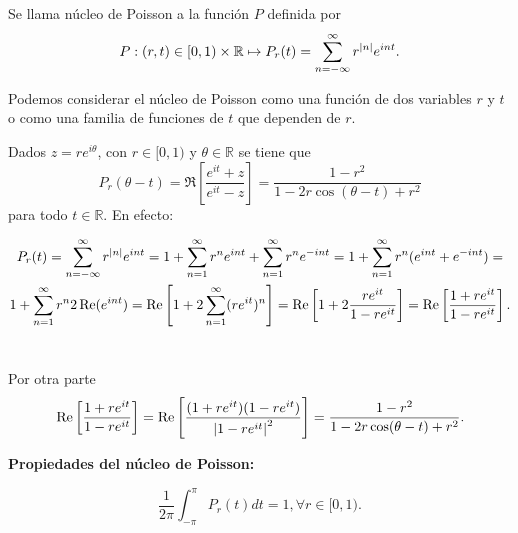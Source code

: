 \begin{definition}
    Se llama núcleo de Poisson a la función $P$ definida por
    \begin{equation}
        \label{poisson1}
        P:(r,t) \in [0,1)\times \mathbb{R} \mapsto P_r(t) = \sum_{n=-\infty}^{\infty} r^{\left\lvert n\right\rvert}e^{int}.
    \end{equation}

    Podemos considerar el núcleo de Poisson como una función de dos variables $r$ y $t$ o como una familia de funciones de $t$ que dependen de $r$.

    Dados $z=re^{i \theta}$, con $r \in [0,1)$ y $\theta \in \mathbb{R}$ se tiene que
    \begin{equation}
        \label{poisson2}
        P_r(\theta - t) = \Re \left[ \dfrac{e^{it} + z}{e^{it} - z} \right] = \dfrac{1 - r^2}{1 - 2r \cos (\theta - t) + r^2}
    \end{equation}
    para todo $t \in \mathbb{R}$. En efecto:

    \begin{multline*}
        P_r(t) = \sum_{n=-\infty}^{\infty} r^{\left\lvert n\right\rvert}e^{int} = 1 + \sum_{n=1}^{\infty} r^n e^{int} + \sum_{n=1}^{\infty} r^n e^{-int} = 1 + \sum_{n=1}^{\infty} r^n (e^{int} + e^{-int}) = \\
        1 + \sum_{n=1}^{\infty} r^n 2 \operatorname{Re}(e^{int}) = \operatorname{Re} \left[ 1 + 2 \sum_{n=1}^{\infty} (r e^{it})^n  \right] = \operatorname{Re} \left[ 1 + 2 \dfrac{re^{it}}{1-re^{it}} \right] = \operatorname{Re} \left[\dfrac{1 + re^{it}}{1-re^{it}} \right].
    \end{multline*}
    \\ \par
    Por otra parte
    \begin{equation*}
        \operatorname{Re} \left[ \dfrac{1 + re^{it}}{1-re^{it}} \right] = \operatorname{Re} \left[ \dfrac{(1 + re^{it})(1 - re^{it})}{\left\lvert1-re^{it}\right\rvert^2} \right] = \dfrac{1 - r^2}{1 - 2r \cos (\theta - t) + r^2}.
    \end{equation*}
\end{definition}

\newpage

\textbf{Propiedades del núcleo de Poisson:}%

\begin{equation}
    \dfrac{1}{2 \pi} \int_{- \pi}^{\pi} P_r (t) dt = 1, \forall r \in [0,1).
\end{equation}

